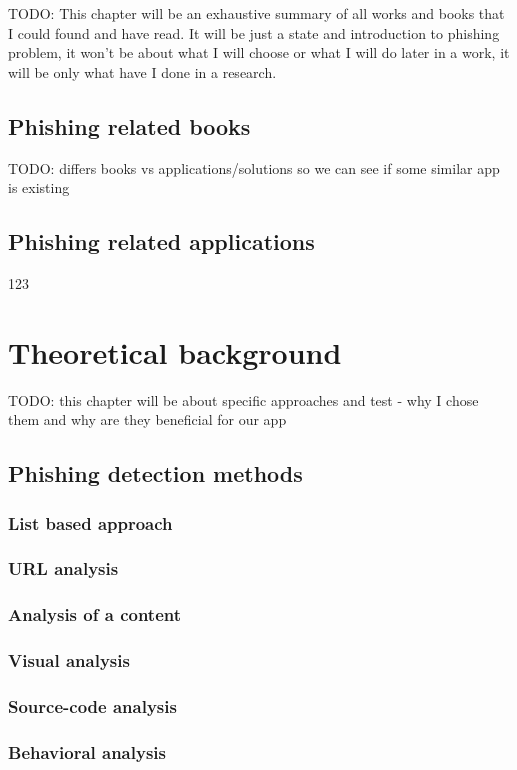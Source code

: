 \documentclass[
  digital, %
  twoside, %
  table,   %
  nolof,     %
  nolot,     %
]{fithesis3}
\begin{document}
TODO: This chapter will be an exhaustive summary of all works and books that I could found and have read. It will be just a state and introduction to phishing problem, it won't be about what I will choose or what I will do later in a work, it will be only what have I done in a research.
\section{Phishing related books}
TODO: differs books vs applications/solutions so we can see if some similar app is existing
\section{Phishing related applications}
123

\chapter{Theoretical background}
TODO: this chapter will be about specific approaches and test - why I chose them and why are they beneficial for our app

\section{Phishing detection methods}
\subsection{List based approach}
\subsection{URL analysis}
\subsection{Analysis of a content}
\subsection{Visual analysis}
\subsection{Source-code analysis}
\subsection{Behavioral analysis}
\end{document}
